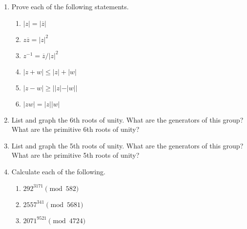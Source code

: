 {\begin{enumerate}
\begin{multicols}{2}
\begin{enumerate}
 \item
$((1-i)/2)^{4}$

 \item
$(-\sqrt{2} - \sqrt{2}\, i)^{12}$
 
 \item
$(-2+2i)^{-5}$
 
\end{enumerate}
\end{multicols}

  
  \item
Prove each of the following statements.
\begin{multicols}{2}
\begin{enumerate}
 
 \item
$|z| = | \overline{z}|$

\item
$z \overline{z} = |z|^2$
 
 \item
$z^{-1} = \overline{z} / |z|^2$

 \item
$|z +w| \leq |z| + |w|$
 
 \item
$|z - w| \geq | |z| - |w||$
 
 \item
$|z w| = |z|  |w|$
 
\end{enumerate}
\end{multicols}


\item
List and graph the 6th roots of unity.  What are the generators of
this group?  What are the primitive 6th roots of unity?
 
 
\item
List and graph the 5th roots of unity.  What are the generators of
this group?  What are the primitive 5th roots of unity? 
 
 
  
\item
Calculate each of the following.
\begin{multicols}{2}
\begin{enumerate}
 
 \item
$292^{3171} \pmod{ 582}$

\item
$2557^{ 341} \pmod{ 5681}$

 \item
$2071^{ 9521} \pmod{ 4724}$
 

\end{enumerate}
\end{multicols}
\end{enumerate}}
